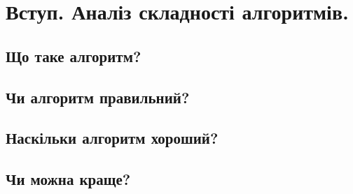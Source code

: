 \documentclass[12pt,a4paper]{report}
\begin{document}
\chapter{Вступ. Аналіз складності алгоритмів.}

\section{Що таке алгоритм?}

\section{Чи алгоритм правильний?}

\section{Наскільки алгоритм хороший?}

\section{Чи можна краще?}
\end{document}
